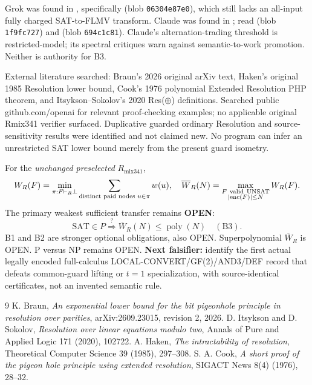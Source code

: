 \documentclass[11pt]{article}
\begin{document}
Grok was found in , specifically  (blob \texttt{06304e87e0}), which still lacks an all-input fully charged SAT-to-FLMV transform. Claude was found in ; read  (blob \texttt{1f9fc727}) and  (blob \texttt{694c1c81}). Claude's alternation-trading threshold is restricted-model; its spectral critiques warn against semantic-to-work promotion. Neither is authority for B3.

External literature searched: Braun's 2026 original arXiv text, Haken's original 1985 Resolution lower bound, Cook's 1976 polynomial Extended Resolution PHP theorem, and Itsykson--Sokolov's 2020 Res($\oplus$) definitions. Searched public github.com/openai for relevant proof-checking examples; no applicable original Rmix341 verifier surfaced. Duplicative guarded ordinary Resolution and source-sensitivity results were identified and not claimed new. No program can infer an unrestricted SAT lower bound merely from the present guard isometry.

For the \emph{unchanged preselected} $R_{\mathrm{mix341}}$,
\[
W_R(F)=\min_{\pi:F\vdash_R\bot}\sum_{\text{distinct paid nodes }u\in\pi}w(u),\quad
\overline W_R(N)=\max_{\substack{F\ {\rm valid\ UNSAT}\\|\mathrm{enc}(F)|\le N}}W_R(F).
\]
The primary weakest sufficient transfer remains \textbf{OPEN}:
\[
\mathrm{SAT}\in P\stackrel{?}{\Longrightarrow}
\overline W_R(N)\le\operatorname{poly}(N)\quad(\mathrm{B3}).
\]
B1 and B2 are stronger optional obligations, also OPEN. Superpolynomial $\overline W_R$ is OPEN. P versus NP remains OPEN. \textbf{Next falsifier:} identify the first actual legally encoded full-calculus LOCAL-CONVERT/GF(2)/AND3/DEF record that defeats common-guard lifting or $t=1$ specialization, with source-identical certificates, not an invented semantic rule.

\begin{thebibliography}{9}
 K. Braun, \emph{An exponential lower bound for the bit pigeonhole principle in resolution over parities}, arXiv:2609.23015, revision 2, 2026.
 D. Itsykson and D. Sokolov, \emph{Resolution over linear equations modulo two}, Annals of Pure and Applied Logic 171 (2020), 102722.
 A. Haken, \emph{The intractability of resolution}, Theoretical Computer Science 39 (1985), 297--308.
 S. A. Cook, \emph{A short proof of the pigeon hole principle using extended resolution}, SIGACT News 8(4) (1976), 28--32.
\end{thebibliography}
\end{document}
